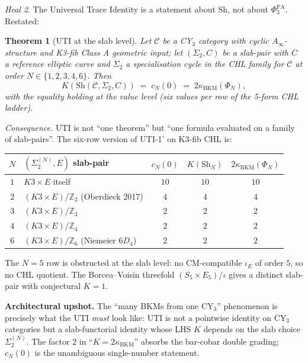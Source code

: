 \documentclass[11pt]{amsart}
\newtheorem{theorem}{Theorem}
\theoremstyle{definition}
\theoremstyle{remark}
\newtheorem{heal}[theorem]{Heal}
\newcommand{\kBKM}{\kappa_{\mathrm{BKM}}}
\newcommand{\PhiFA}{\Phi^{\mathrm{FA}}}
\begin{document}
\begin{heal}\label{heal:uti-on-slab-functor}
The Universal Trace Identity is a statement about $\mathrm{Sh}$, not about $\PhiFA_3$.
Restated:

\begin{theorem}[UTI at the slab level]\label{thm:uti-slab}
Let $\mathcal{C}$ be a CY$_3$ category with cyclic $A_\infty$-structure and K3-fib Class A
geometric input; let $(\Sigma_2, C)$ be a slab-pair with $C$ a reference elliptic curve and
$\Sigma_2$ a specialisation cycle in the CHL family for $\mathcal{C}$ at order $N \in \{1, 2, 3, 4, 6\}$.
Then
\[
K(\mathrm{Sh}(\mathcal{C}, \Sigma_2, C)) \;=\; c_N(0) \;=\; 2 \kBKM(\Phi_N),
\]
with the equality holding at the value level (six values per row of the 5-form CHL ladder).
\end{theorem}

\emph{Consequence.} UTI is not ``one theorem'' but ``one formula evaluated on a family of
slab-pairs''. The six-row version of UTI-1' on K3-fib CHL is:
\begin{center}
\begin{tabular}{c|l|c|c|c}
$N$ & $(\Sigma_2^{(N)}, E)$ slab-pair & $c_N(0)$ & $K(\mathrm{Sh}_N)$ & $2\kBKM(\Phi_N)$ \\ \hline
$1$ & $K3 \times E$ itself & $10$ & $10$ & $10$ \\
$2$ & $(K3 \times E)/\mathbb{Z}_2$ (Oberdieck 2017) & $4$ & $4$ & $4$ \\
$3$ & $(K3 \times E)/\mathbb{Z}_3$ & $2$ & $2$ & $2$ \\
$4$ & $(K3 \times E)/\mathbb{Z}_4$ & $2$ & $2$ & $2$ \\
$6$ & $(K3 \times E)/\mathbb{Z}_6$ (Niemeier $6D_4$) & $2$ & $2$ & $2$ \\
\end{tabular}
\end{center}

The $N = 5$ row is obstructed at the slab level: no CM-compatible $\iota_E$ of order $5$, so no
CHL quotient. The Borcea--Voisin threefold $(S_5 \times E_5)/\iota$ gives a distinct slab-pair with
conjectural $K = 1$.

\textbf{Architectural upshot.} The ``many BKMs from one CY$_3$'' phenomenon is precisely what the
UTI \emph{must} look like: UTI is not a pointwise identity on CY$_3$ categories but a
slab-functorial identity whose LHS $K$ depends on the slab choice $\Sigma_2^{(N)}$. The factor
$2$ in ``$K = 2\kBKM$'' absorbs the bar-cobar double grading; $c_N(0)$ is the unambiguous
single-number statement.
\end{heal}
\end{document}
